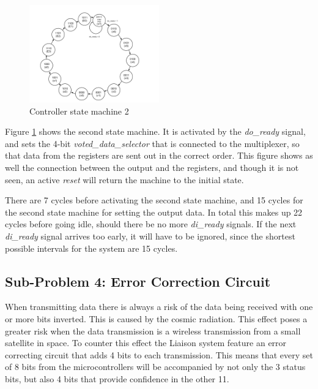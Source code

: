 \documentclass[a4paper]{IEEEtran}
\begin{document}
\begin{figure}[h!]
    \centering
    \includegraphics[width=0.50\textwidth]{Figures/Solution/ControllerStateMachine2}
    \caption{Controller state machine 2}
    \label{fig:ControllerStateMachine2}
\end{figure}

Figure \ref{fig:ControllerStateMachine2} shows the second state machine.
It is activated by the \textit{do\_ready} signal, and sets the 4-bit \textit{voted\_data\_selector} that is connected to the multiplexer, so that data from the registers are sent out in the correct order.
This figure shows as well the connection between the output and the registers, and though it is not seen, an active \textit{reset} will return the machine to the initial state.

There are 7 cycles before activating the second state machine, and 15 cycles for the second state machine for setting the output data.
In total this makes up 22 cycles before going idle, should there be no more \textit{di\_ready} signals.
If the next \textit{di\_ready} signal arrives too early, it will have to be ignored, since the shortest possible intervals for the system are 15 cycles.

\subsection{Sub-Problem 4: Error Correction Circuit}
When transmitting data there is always a risk of the data being received with one or more bits inverted.
This is caused by the cosmic radiation.
This effect poses a greater risk when the data transmission is a wireless transmission from a small satellite in space.
To counter this effect the Liaison system feature an error correcting circuit that adds 4 bits to each transmission.
This means that every set of 8 bits from the microcontrollers will be accompanied by not only the 3 status bits, but also 4 bits that provide confidence in the other 11.
\end{document}
